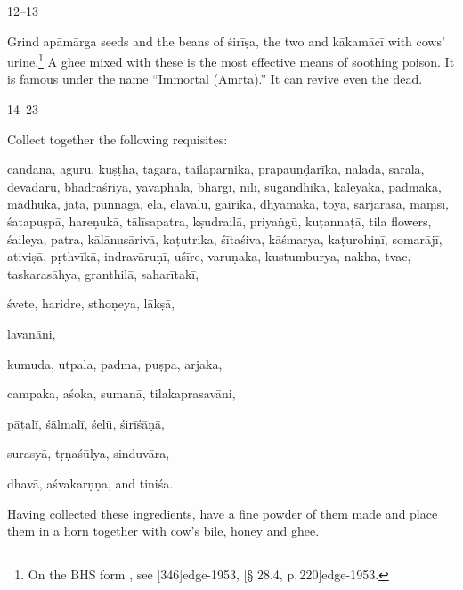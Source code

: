 \begin{translation}
    
\item [12--13]    

Grind \gls{apāmārga} seeds and the beans of \gls{śirīṣa}, the two 
 and \gls{kākamācī} with cows' urine.\footnote{On the BHS 
form , see [346]{edge-1953}, [\S 
28.4, p.\,220]{edge-1953}.}  A ghee mixed with 
these is the most effective means of soothing poison.  It is famous under the 
name “Immortal (Amṛta).”  It can revive even the dead.


\item [14--23] 

Collect together the following requisites:

\gls{candana}, \gls{aguru},  \gls{kuṣṭha},  \gls{tagara},  
\gls{tailaparṇika}, 
\gls{prapauṇḍarīka},  
\gls{nalada},  
\gls{sarala},  
\gls{devadāru}, 
\gls{bhadraśriya},  
\gls{yavaphalā},  
\gls{bhārgī}, 
\gls{nīlī},  
\gls{sugandhikā}, 
\gls{kāleyaka},  
\gls{padmaka},  
\gls{madhuka},  
 \gls{jaṭā}, 
\gls{punnāga},
\gls{elā},  
\gls{elavālu},  \gls{gairika},  \gls{dhyāmaka},  
\gls{toya},  
\gls{sarjarasa}, 
\gls{māṃsī},  
\gls{śatapuṣpā},  
\gls{hareṇukā}, 
\gls{tālīsapatra},   
\gls{kṣudrailā},   
\gls{priyaṅgū},   
\gls{kuṭannaṭā},  
\gls{tila} flowers,   
\gls{śaileya},   
\gls{patra},  
\gls{kālānusārivā},  
\gls{kaṭutrika},   
\gls{śītaśiva},   
\gls{kāśmarya},   
\gls{kaṭurohiṇī},  
\gls{somarājī},   
\gls{ativiṣā},  
\gls{pṛthvīkā},  
\gls{indravāruṇī}, 
\gls{uśīre},  
\gls{varuṇaka}, 
\gls{kustumburya},  
\gls{nakha},  
\gls{tvac},  
\gls{taskarasāhya},  
\gls{granthilā},  
\gls{saharītakī}, 


\gls{śvete},  
\gls{haridre}, 
\gls{ sthoṇeya},  
\gls{lākṣā},   

\gls{lavanāni}, 


\gls{kumuda},  
\gls{utpala},  
\gls{padma},  
\gls{puṣpa},  
\gls{arjaka}, 


\gls{campaka},  
\gls{aśoka},  
\gls{sumanā},  
\gls{tilakaprasavāni}, 


\gls{pāṭalī},  
\gls{śālmalī},  
\gls{śelū},  
\gls{śirīśāṇā},  


\gls{surasyā},  
\gls{tṛṇaśūlya},  
\gls{sinduvāra}, 


\gls{dhavā},  
\gls{aśvakarṇṇa},  and 
\gls{tiniśa}.

Having collected these ingredients, have a fine powder of them made and 
place them in a horn together with cow's bile, honey and ghee.


\end{translation}
